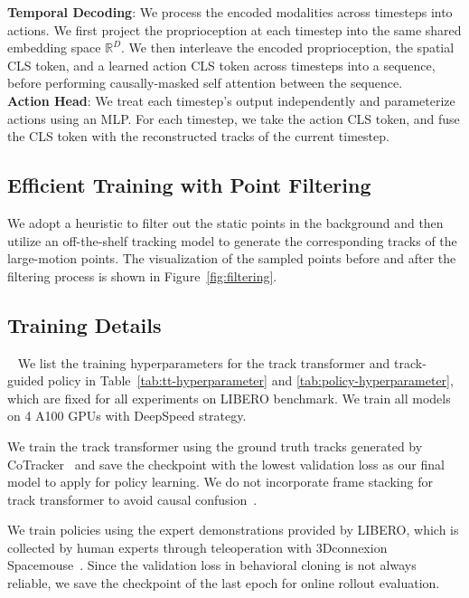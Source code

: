 \noindent\textbf{Temporal Decoding}: We process the encoded modalities across timesteps into actions. We first project the proprioception at each timestep into the same shared embedding space $\mathbb{R}^D$. We then interleave the encoded proprioception, the spatial CLS token, and a learned action CLS token across timesteps into a sequence, before performing causally-masked self attention between the sequence. \\

\noindent\textbf{Action Head}: We treat each timestep's output independently and parameterize actions using an MLP. For each timestep, we take the action CLS token, and fuse the CLS token with the reconstructed tracks of the current timestep. \\

\subsection{Efficient Training with Point Filtering}\label{sec:app:track-filter}
We adopt a heuristic to filter out the static points in the background and then utilize an off-the-shelf tracking model to generate the corresponding tracks of the large-motion points. The visualization of the sampled points before and after the filtering process is shown in Figure~\ref{fig:filtering}.


\subsection{Training Details}~\label{sec:app:train-detail}
We list the training hyperparameters for the track transformer and track-guided policy in Table~\ref{tab:tt-hyperparameter} and \ref{tab:policy-hyperparameter}, which are fixed for all experiments on LIBERO benchmark. We train all models on 4 A100 GPUs with DeepSpeed strategy.

We train the track transformer using the ground truth tracks generated by CoTracker~\cite{karaev2023cotracker} and save the checkpoint with the lowest validation loss as our final model to apply for policy learning. We do not incorporate frame stacking for track transformer to avoid causal confusion~\cite{wen2022primenet}. 

We train policies using the expert demonstrations provided by LIBERO, which is collected by human experts through teleoperation with 3Dconnexion Spacemouse~\cite{liu2023libero}. Since the validation loss in behavioral cloning is not always reliable, we save the checkpoint of the last epoch for online rollout evaluation.
